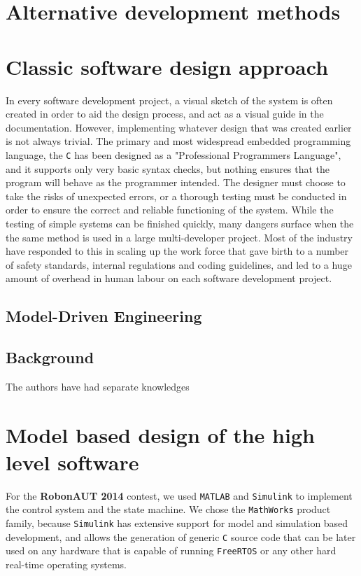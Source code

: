 \section{Alternative development methods}

\section{Classic software design approach}

In every software development project, a visual sketch of the system is often created in order to aid the design process, and act as a visual guide in the documentation. However, implementing whatever design that was created earlier is not always trivial. The primary and most widespread embedded programming language, the \verb!C! has been designed as a "Professional Programmers Language", and it supports only very basic syntax checks, but nothing ensures that the program will behave as the programmer intended. The designer must choose to take the risks of unexpected errors, or a thorough testing must be conducted in order to ensure the correct and reliable functioning of the system. While the testing of simple systems can be finished quickly, many dangers surface when the the same method is used in a large multi-developer project. Most of the industry have responded to this in scaling up the work force that gave birth to a number of safety standards, internal regulations and coding guidelines\cite{misra}, and led to a huge amount of overhead in human labour on each software development project.

\subsection{Model-Driven Engineering}



\subsection{Background}

The authors have had separate knowledges

\section{Model based design of the high level software}

For the \textbf{RobonAUT 2014} contest, we used \verb!MATLAB! and \verb!Simulink! to implement the control system and the state machine. We chose the \verb!MathWorks! product family, because \verb!Simulink! has extensive support for model and simulation based development, and allows the generation of generic \verb!C! source code that can be later used on any hardware that is capable of running \verb!FreeRTOS! or any other hard real-time operating systems.

